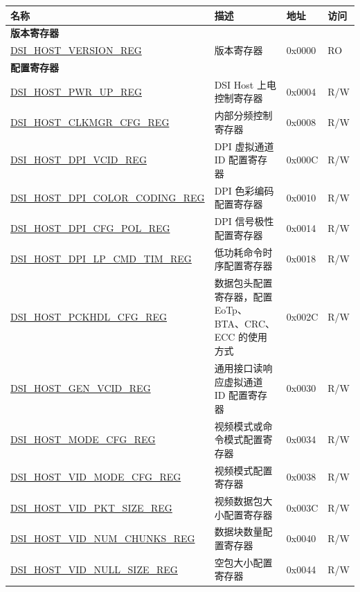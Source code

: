 \begin{longtable}{ | p{6.8cm} | p{6.8cm} | p{1.2cm} | p{1cm} | }
\hline\rowcolor{lightgray}
名称 & 描述 & 地址 & 访问 \\ \hline
\endhead
\multicolumn{4}{|l|}{\textbf{版本寄存器}} \\ \hline
\hyperref[regdesc:DSIHOSTVERSIONREG]{DSI\_HOST\_VERSION\_REG} & 版本寄存器 & 0x0000 & RO \\ \hline
\multicolumn{4}{|l|}{\textbf{配置寄存器}} \\ \hline
\hyperref[regdesc:DSIHOSTPWRUPREG]{DSI\_HOST\_PWR\_UP\_REG} & DSI Host 上电控制寄存器 & 0x0004 & R/W \\ \hline
\hyperref[regdesc:DSIHOSTCLKMGRCFGREG]{DSI\_HOST\_CLKMGR\_CFG\_REG} & 内部分频控制寄存器 & 0x0008 & R/W \\ \hline
\hyperref[regdesc:DSIHOSTDPIVCIDREG]{DSI\_HOST\_DPI\_VCID\_REG} & DPI 虚拟通道 ID 配置寄存器 & 0x000C & R/W \\ \hline
\hyperref[regdesc:DSIHOSTDPICOLORCODINGREG]{DSI\_HOST\_DPI\_COLOR\_CODING\_REG} & DPI 色彩编码配置寄存器 & 0x0010 & R/W \\ \hline
\hyperref[regdesc:DSIHOSTDPICFGPOLREG]{DSI\_HOST\_DPI\_CFG\_POL\_REG} & DPI 信号极性配置寄存器 & 0x0014 & R/W \\ \hline
\hyperref[regdesc:DSIHOSTDPILPCMDTIMREG]{DSI\_HOST\_DPI\_LP\_CMD\_TIM\_REG} & 低功耗命令时序配置寄存器 & 0x0018 & R/W \\ \hline
\hyperref[regdesc:DSIHOSTPCKHDLCFGREG]{DSI\_HOST\_PCKHDL\_CFG\_REG} & 数据包头配置寄存器，配置 EoTp、BTA、CRC、ECC 的使用方式 & 0x002C & R/W \\ \hline
\hyperref[regdesc:DSIHOSTGENVCIDREG]{DSI\_HOST\_GEN\_VCID\_REG} & 通用接口读响应虚拟通道 ID 配置寄存器 & 0x0030 & R/W \\ \hline
\hyperref[regdesc:DSIHOSTMODECFGREG]{DSI\_HOST\_MODE\_CFG\_REG} & 视频模式或命令模式配置寄存器 & 0x0034 & R/W \\ \hline
\hyperref[regdesc:DSIHOSTVIDMODECFGREG]{DSI\_HOST\_VID\_MODE\_CFG\_REG} & 视频模式配置寄存器 & 0x0038 & R/W \\ \hline
\hyperref[regdesc:DSIHOSTVIDPKTSIZEREG]{DSI\_HOST\_VID\_PKT\_SIZE\_REG} & 视频数据包大小配置寄存器 & 0x003C & R/W \\ \hline
\hyperref[regdesc:DSIHOSTVIDNUMCHUNKSREG]{DSI\_HOST\_VID\_NUM\_CHUNKS\_REG} & 数据块数量配置寄存器 & 0x0040 & R/W \\ \hline
\hyperref[regdesc:DSIHOSTVIDNULLSIZEREG]{DSI\_HOST\_VID\_NULL\_SIZE\_REG} & 空包大小配置寄存器 & 0x0044 & R/W \\ \hline

\end{longtable}
